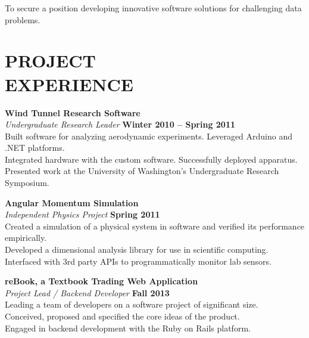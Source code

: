 \documentclass[margin,line]{resume}
\begin{document}
\begin{resume}
    To secure a position developing innovative software solutions for challenging data problems.\vspace{-3mm}\\\vspace{-1mm}%

\sectionline

    \section{\mysidestyle \textbf{\large{P}\small{ROJECT\\EXPERIENCE}}}

    \textbf{\listing Wind Tunnel Research Software} \vspace{2mm}\\\vspace{1mm}%
    \textsl{Undergraduate Research Leader} \hfill \textbf{Winter 2010 -- Spring 2011}\\
    Built software for analyzing aerodynamic experiments. Leveraged Arduino and .NET platforms.\\
    Integrated hardware with the custom software. Successfully deployed apparatus.\\
    Presented work at the University of Washington's Undergraduate Research Symposium.

    \textbf{\listing Angular Momentum Simulation} \vspace{2mm}\\\vspace{1mm}%
    \textsl{Independent Physics Project} \hfill \textbf{Spring 2011}\\
    Created a simulation of a physical system in software and verified its performance empirically.\\
    Developed a dimensional analysis library for use in scientific computing.\\
    Interfaced with 3rd party APIs to programmatically monitor lab sensors.

    \textbf{\listing reBook, a Textbook Trading Web Application} \vspace{2mm}\\\vspace{1mm}%
    \textsl{Project Lead / Backend Developer} \hfill \textbf{Fall 2013}\\
    Leading a team of developers on a software project of significant size.\\
    Conceived, proposed and specified the core ideas of the product.\\
    Engaged in backend development with the Ruby on Rails platform.


\end{resume}
\end{document}
